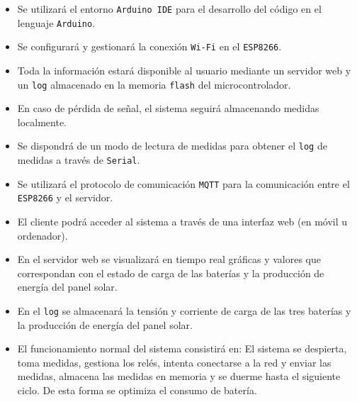 \begin{itemize}
    \item Se utilizará el entorno \texttt{Arduino IDE} para el desarrollo del código en el lenguaje \texttt{Arduino}.
    \item Se configurará y gestionará la conexión \texttt{Wi-Fi} en el \texttt{ESP8266}.
    \item Toda la información estará disponible al usuario mediante un servidor web y un \texttt{log} almacenado en la memoria \texttt{flash} del microcontrolador.
    \item En caso de pérdida de señal, el sistema seguirá almacenando medidas localmente.
    \item Se dispondrá de un modo de lectura de medidas para obtener el \texttt{log} de medidas a través de \texttt{Serial}.
    \item Se utilizará el protocolo de comunicación \texttt{MQTT} para la comunicación entre el \texttt{ESP8266} y el servidor.
    \item El cliente podrá acceder al sistema a través de una interfaz web (en móvil u ordenador).
    \item En el servidor web se visualizará en tiempo real gráficas y valores que correspondan con el estado de carga de las baterías y la producción de energía del panel solar.
    \item En el \texttt{log} se almacenará la tensión y corriente de carga de las tres baterías y la producción de energía del panel solar.
    \item El funcionamiento normal del sistema consistirá en: El sistema se despierta, toma medidas, gestiona los relés, intenta conectarse a la red y enviar las medidas, almacena las medidas en memoria y se duerme hasta el siguiente ciclo. De esta forma se optimiza el consumo de batería.
\end{itemize}
